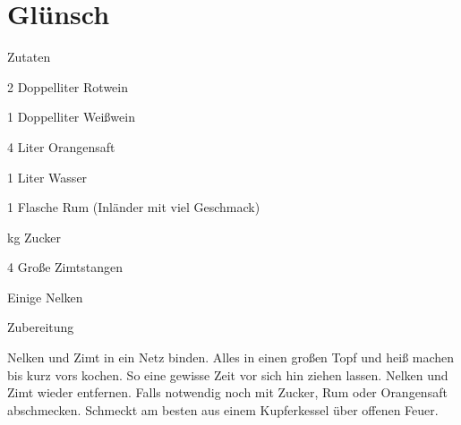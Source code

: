 \chapter*{Glünsch}
\begin{multicols}{2}
 {\Large Zutaten}
 \begin{Zutaten}
		\item 2 Doppelliter Rotwein
		\item 1 Doppelliter Weißwein
		\item 4 Liter Orangensaft
		\item 1 Liter Wasser
		\item 1 Flasche Rum (Inländer mit viel Geschmack)
		\item {}kg Zucker
		\item 4 Große Zimtstangen
		\item Einige Nelken
		
		
\end{Zutaten}
\columnbreak
\end{multicols}

{\Large Zubereitung} \newline
\begin{addmargin}[1cm]{0cm}
	Nelken und Zimt in ein Netz binden.\newline
	Alles in einen großen Topf und heiß machen bis kurz vors kochen.\newline
	So eine gewisse Zeit vor sich hin ziehen lassen.\newline
	Nelken und Zimt wieder entfernen.\newline
	Falls notwendig noch mit Zucker, Rum oder Orangensaft abschmecken.\newline\newline
	Schmeckt am besten aus einem Kupferkessel über offenen Feuer.
	
	

	
\end{addmargin}
